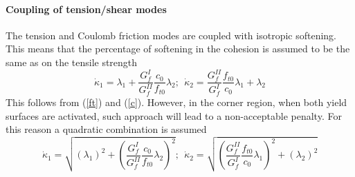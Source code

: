 \documentclass[a4paper]{article}
\newcommand{\del}[2]{\mbox{$\displaystyle\frac{#1}{#2}$}}
\begin{document}
\paragraph{Coupling of tension/shear modes}
The tension and Coulomb friction modes are coupled with isotropic softening. This means that the percentage of softening in the cohesion is assumed to be the same as on the tensile strength
\begin{equation}
  \dot\kappa_1=\lambda_1+\del{G^I_f}{G^{II}_f}\del{c_0}{f_{t0}}\lambda_2;\ \ \dot\kappa_2=\del{G^{II}_f}{G^I_f}\del{f_{t0}}{c_0}\lambda_1+\lambda_2
\end{equation}
This follows from (\ref{ft}) and (\ref{c}). However, in the corner region, when both yield surfaces are activated, such approach will lead to a non-acceptable penalty. For this reason a quadratic combination is assumed
\begin{equation}
  \dot\kappa_1=\sqrt{(\lambda_1)^2+\left(\del{G^I_f}{G^{II}_f}\del{c_0}{f_{t0}}\lambda_2\right)^2};\ \ \dot\kappa_2=\sqrt{\left(\del{G^{II}_f}{G^I_f}\del{f_{t0}}{c_0}\lambda_1\right)^2+(\lambda_2)^2}
\end{equation}
\end{document}
